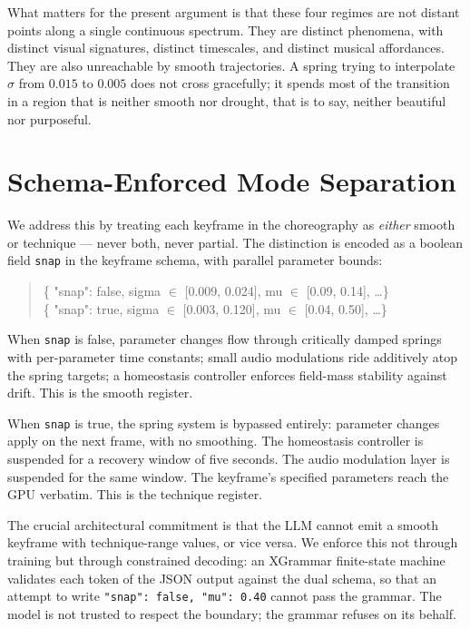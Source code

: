 \documentclass[11pt]{article}
\begin{document}
\medskip

What matters for the present argument is that these four regimes are not
distant points along a single continuous spectrum. They are distinct
phenomena, with distinct visual signatures, distinct timescales, and
distinct musical affordances. They are also unreachable by smooth
trajectories. A spring trying to interpolate $\sigma$ from $0.015$ to
$0.005$ does not cross gracefully; it spends most of the transition in a
region that is neither smooth nor drought, that is to say, neither
beautiful nor purposeful.

\section{Schema-Enforced Mode Separation}

We address this by treating each keyframe in the choreography as
\emph{either} smooth or technique --- never both, never partial. The
distinction is encoded as a boolean field \texttt{snap} in the keyframe
schema, with parallel parameter bounds:

\begin{quote}\small\ttfamily
\{ "snap": false, sigma $\in$ [0.009, 0.024], mu $\in$ [0.09, 0.14], \dots\}\\
\{ "snap": true,\; sigma $\in$ [0.003, 0.120], mu $\in$ [0.04, 0.50], \dots\}
\end{quote}

When \texttt{snap} is false, parameter changes flow through critically
damped springs with per-parameter time constants; small audio modulations
ride additively atop the spring targets; a homeostasis controller enforces
field-mass stability against drift. This is the smooth register.

When \texttt{snap} is true, the spring system is bypassed entirely:
parameter changes apply on the next frame, with no smoothing. The
homeostasis controller is suspended for a recovery window of five seconds.
The audio modulation layer is suspended for the same window. The keyframe's
specified parameters reach the GPU verbatim. This is the technique register.

The crucial architectural commitment is that the LLM cannot emit a smooth
keyframe with technique-range values, or vice versa. We enforce this not
through training but through constrained decoding: an XGrammar finite-state
machine validates each token of the JSON output against the dual schema, so
that an attempt to write \texttt{"snap": false, "mu": 0.40} cannot pass the
grammar. The model is not trusted to respect the boundary; the grammar
refuses on its behalf.
\end{document}
